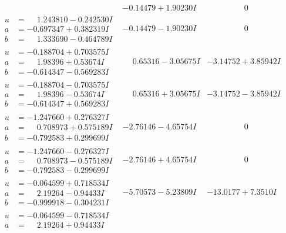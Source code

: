 \documentclass[1p]{elsarticle_modified}
\theoremstyle{definition}
\begin{document}
$$\begin{array}{c|c|c}
 & -0.14479 + 1.90230 I & \phantom{-0.000000 } 0 \\ \hline\begin{aligned}
u &= \phantom{-}1.243810 - 0.242530 I \\
a &= -0.697347 + 0.382319 I \\
b &= \phantom{-}1.333690 - 0.464789 I\end{aligned}
 & -0.14479 - 1.90230 I & \phantom{-0.000000 } 0 \\ \hline\begin{aligned}
u &= -0.188704 + 0.703575 I \\
a &= \phantom{-}1.98396 + 0.53674 I \\
b &= -0.614347 - 0.569283 I\end{aligned}
 & \phantom{-}0.65316 - 3.05675 I & -3.14752 + 3.85942 I \\ \hline\begin{aligned}
u &= -0.188704 - 0.703575 I \\
a &= \phantom{-}1.98396 - 0.53674 I \\
b &= -0.614347 + 0.569283 I\end{aligned}
 & \phantom{-}0.65316 + 3.05675 I & -3.14752 - 3.85942 I \\ \hline\begin{aligned}
u &= -1.247660 + 0.276327 I \\
a &= \phantom{-}0.708973 + 0.575189 I \\
b &= -0.792583 + 0.299699 I\end{aligned}
 & -2.76146 - 4.65754 I & \phantom{-0.000000 } 0 \\ \hline\begin{aligned}
u &= -1.247660 - 0.276327 I \\
a &= \phantom{-}0.708973 - 0.575189 I \\
b &= -0.792583 - 0.299699 I\end{aligned}
 & -2.76146 + 4.65754 I & \phantom{-0.000000 } 0 \\ \hline\begin{aligned}
u &= -0.064599 + 0.718534 I \\
a &= \phantom{-}2.19264 - 0.94433 I \\
b &= -0.999918 - 0.304231 I\end{aligned}
 & -5.70573 - 5.23809 I & -13.0177 + 7.3510 I \\ \hline\begin{aligned}
u &= -0.064599 - 0.718534 I \\
a &= \phantom{-}2.19264 + 0.94433 I \\

\end{aligned}
\end{array}$$
\end{document}
